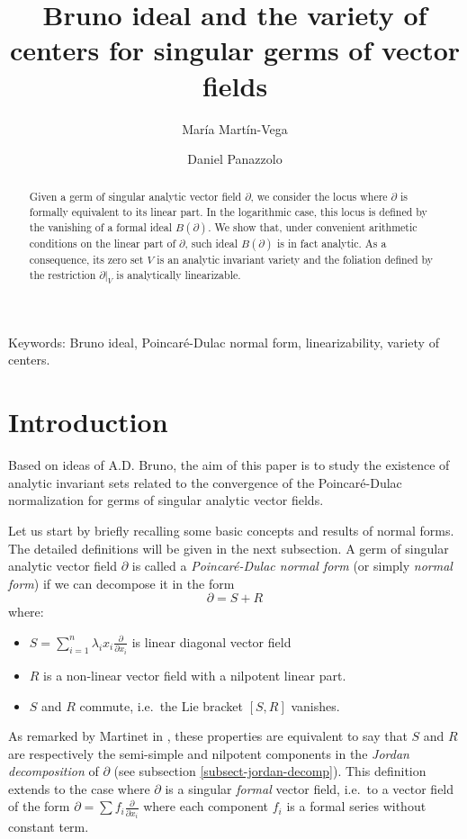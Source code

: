 \documentclass[10pt,twoside,reqno]{amsart}
\title{Bruno ideal and the variety of centers for singular germs of vector fields}
\author{María Martín-Vega}
\author{Daniel Panazzolo}
\date{}
\theoremstyle{remark}
\theoremstyle{remark}
\begin{document}
\maketitle

\begin{abstract}
    Given a germ of singular analytic vector field $\partial$, we consider the locus where $\partial$ is formally equivalent to its linear part. In the logarithmic case, this locus is defined by the vanishing of a formal ideal $B(\partial)$.  We show that, under convenient arithmetic conditions on the linear part of $\partial$, such ideal $B(\partial)$ is in fact analytic. As a consequence, its zero set $V$ is an analytic invariant variety and the foliation defined by the restriction $\partial|_V$ is analytically linearizable. 
\end{abstract}
{\small{\sc Keywords}: Bruno ideal, Poincaré-Dulac normal form, linearizability, variety of centers.}

\tableofcontents

\section{Introduction}

Based on ideas of A.D. Bruno, the aim of this paper is to study the existence of analytic invariant sets related to the convergence of the Poincaré-Dulac normalization for germs of singular analytic vector fields. 

Let us start by briefly recalling some basic concepts and results of normal forms. The detailed definitions will be given in the next subsection.
A germ of singular analytic vector field $\partial$ is called a {\em Poincaré-Dulac normal form} (or simply {\em normal form}) if we can decompose it in the form
$$
\partial = S + R
$$ 
where:
\begin{itemize}
\setlength{\itemsep}{0.4em}
\item[(1)] $S= \sum_{i=1}^n \lambda_ix_i \frac{\partial}{\partial x_i}$ is linear diagonal vector field
\item[(2)] $R$ is a non-linear vector field with a nilpotent linear part.
\item[(3)] $S$ and $R$ commute, i.e.~the Lie bracket $[S,R]$ vanishes. 
\end{itemize}
As remarked by Martinet in \cite{Martinet1981Norm}, these properties are equivalent to say that $S$ and $R$ are respectively the semi-simple and nilpotent components in the {\em Jordan decomposition} of $\partial$ (see subsection \ref{subsect-jordan-decomp}).  This definition extends to the case where $\partial$ is a singular {\em formal} vector field, i.e.~to a vector field of the form $\partial = \sum f_i \frac{\partial}{\partial x_i}$ where each component $f_i$ is a formal series without constant term.
\end{document}
